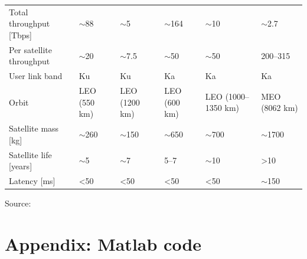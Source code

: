 \documentclass[english, 12pt, a4paper, elec, utf8, a-1b, online]{aaltothesis}
\begin{document}
\begin{landscape}
\begin{table}[h]
\begin{tabular}{@{}llllll@{}}
    Total throughput {[}Tbps{]} & $\sim$88     & $\sim$5         & $\sim$164    & $\sim$10            & $\sim$2.7        \\
    Per satellite throughput    & $\sim$20     & $\sim$7.5       & $\sim$50     & $\sim$50            & 200--315         \\
    User link band              & Ku           & Ku              & Ka           & Ka                  & Ka               \\
    Orbit                       & LEO (550 km) & LEO (1200 km)   & LEO (600 km) & LEO (1000--1350 km) & MEO (8062 km)    \\
    Satellite mass {[}kg{]}     & $\sim$260    & $\sim$150       & $\sim$650    & $\sim$700           & $\sim$1700       \\
    Satellite life {[}years{]}  & $\sim$5      & $\sim$7         & 5--7         & $\sim$10            & \textgreater{}10 \\
    Latency {[}ms{]}            & \textless 50 & \textless 50    & \textless 50 & \textless 50        & $\sim$150        \\ \bottomrule
    \end{tabular}
    \end{table}

    Source: \cite{euspa-secure-satcom-2023}

    \vfill
  \raisebox{-10pt}{\makebox[\linewidth]{\thepage}}

\end{landscape}

\clearpage
\section{Appendix: Matlab code} \label{appendix-matlab-code}


\end{document}
